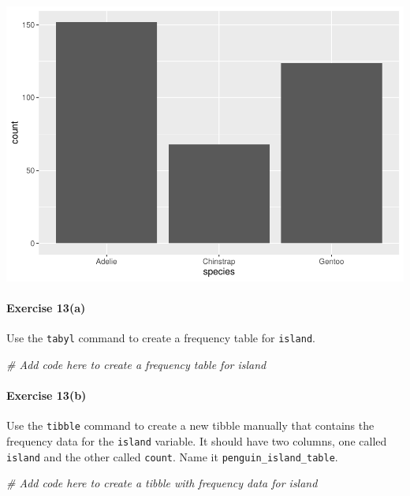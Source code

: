 \documentclass[
]{book}
\newenvironment{Shaded}{\begin{snugshade}}{\end{snugshade}}
\newcommand{\CommentTok}[1]{\textcolor[rgb]{0.56,0.35,0.01}{\textit{#1}}}
\begin{document}
\includegraphics{intro_stats_files/figure-latex/unnamed-chunk-75-1.pdf}

\hypertarget{exercise-13a}{%
\paragraph*{Exercise 13(a)}\label{exercise-13a}}

Use the \texttt{tabyl} command to create a frequency table for \texttt{island}.

\begin{Shaded}
\begin{Highlighting}[]
\CommentTok{\# Add code here to create a frequency table for island}
\end{Highlighting}
\end{Shaded}

\hypertarget{exercise-13b}{%
\paragraph*{Exercise 13(b)}\label{exercise-13b}}

Use the \texttt{tibble} command to create a new tibble manually that contains the frequency data for the \texttt{island} variable. It should have two columns, one called \texttt{island} and the other called \texttt{count}. Name it \texttt{penguin\_island\_table}.

\begin{Shaded}
\begin{Highlighting}[]
\CommentTok{\# Add code here to create a tibble with frequency data for island}
\end{Highlighting}
\end{Shaded}
\end{document}
